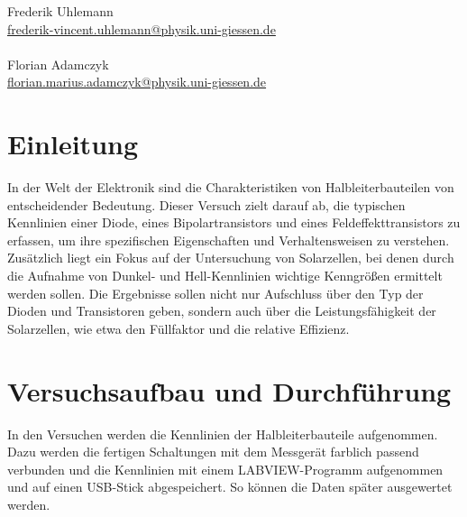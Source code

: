 \documentclass[12pt,a4paper,ngerman]{report}
\begin{document}
\begin{titlepage}
\begin{minipage}{0.49\textwidth}
\begin{flushright}
				\large{Frederik Uhlemann}\\
				\small{\href{mailto:frederik-vincent.uhlemann@physik.uni-giessen.de}{frederik-vincent.uhlemann@physik.uni-giessen.de}\\~\\
				}
				\large{Florian Adamczyk} \\
				\small{\href{mailto:florian.marius.adamczyk@physik.uni-giessen.de}{florian.marius.adamczyk@physik.uni-giessen.de}\\
			}
		\end{flushright}
	\end{minipage}
	
	\end{titlepage}
	
\setcounter{secnumdepth}{3}
\setcounter{tocdepth}{2}
\tableofcontents


	
\chapter*{Einleitung}
	
	In der Welt der Elektronik sind die Charakteristiken von Halbleiterbauteilen von entscheidender Bedeutung. Dieser Versuch zielt darauf ab, die typischen Kennlinien einer Diode, eines Bipolartransistors und eines Feldeffekttransistors zu erfassen, um ihre spezifischen Eigenschaften und Verhaltensweisen zu verstehen. Zusätzlich liegt ein Fokus auf der Untersuchung von Solarzellen, bei denen durch die Aufnahme von Dunkel- und Hell-Kennlinien wichtige Kenngrößen ermittelt werden sollen. Die Ergebnisse sollen nicht nur Aufschluss über den Typ der Dioden und Transistoren geben, sondern auch über die Leistungsfähigkeit der Solarzellen, wie etwa den Füllfaktor und die relative Effizienz.



\chapter{Versuchsaufbau und Durchführung}
	In den Versuchen werden die Kennlinien der Halbleiterbauteile aufgenommen. Dazu werden die fertigen Schaltungen mit dem Messgerät farblich passend verbunden und die Kennlinien mit einem LABVIEW-Programm aufgenommen und auf einen USB-Stick abgespeichert. So können die Daten später ausgewertet werden.\\
\end{document}
